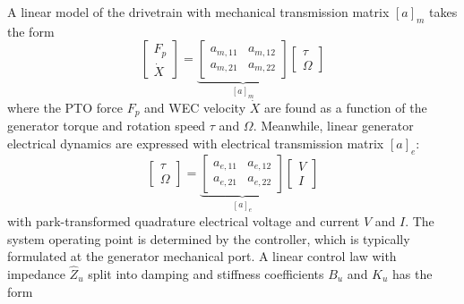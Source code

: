 A linear model of the drivetrain with mechanical transmission matrix $[a]_m$ takes the form
\begin{equation}
\begin{bmatrix}
F_p \\ \dot{X}
\end{bmatrix}
=
\underbrace{\begin{bmatrix}
a_{m,11} & a_{m,12} \\
a_{m,21} & a_{m,22}
\end{bmatrix}}
_{[a]_m}
\begin{bmatrix}
 \tau\\ \Omega
\end{bmatrix}
\end{equation}
where the PTO force $F_p$ and WEC velocity $\dot{X}$ are found as a function of the generator torque and rotation speed $\tau$ and $\Omega$.
Meanwhile, linear generator electrical dynamics are expressed with electrical transmission matrix $[a]_e$:
\begin{equation}
\begin{bmatrix}
 \tau\\ \Omega
\end{bmatrix}
=
\underbrace{\begin{bmatrix}
a_{e,11} & a_{e,12} \\
a_{e,21} & a_{e,22}
\end{bmatrix}}
_{[a]_e}
\begin{bmatrix}
 V \\ I
\end{bmatrix}
\end{equation}
with park-transformed quadrature electrical voltage and current $V$ and $I$.
The system operating point is determined by the controller, which is typically formulated at the generator mechanical port.
A linear control law with impedance $\hat{Z}_u$ split into damping and stiffness coefficients $B_u$ and $K_u$ has the form 
